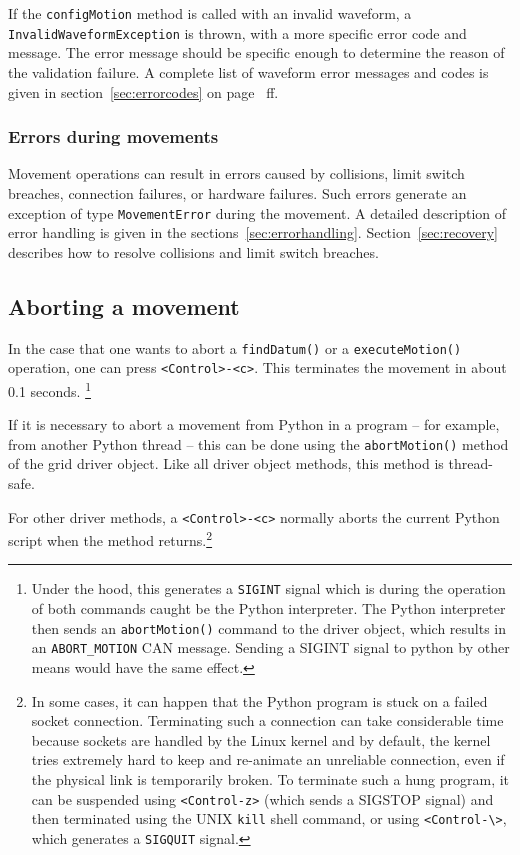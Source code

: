 \documentclass[11pt,a4paper]{scrartcl}
\begin{document}
\begin{sloppypar}
If the \texttt{configMotion} method is called with an invalid
waveform, a \texttt{InvalidWaveformException} is thrown, with a more
specific error code and message. The error message should be specific
enough to determine the reason of the validation failure.  A complete
list of waveform error messages and codes is given in
section~\ref{sec:errorcodes} on page~\pageref{sec:errorcodes} ff.
\end{sloppypar}

\subsubsection{Errors during movements}
Movement operations can result in errors caused by collisions, limit
switch breaches, connection failures, or hardware failures. Such
errors generate an exception of type \texttt{MovementError} during the
movement. A detailed description of error handling is given in the
sections~\ref{sec:errorhandling}. Section~\ref{sec:recovery} describes
how to resolve collisions and limit switch breaches.





\subsection{Aborting a movement}
  In the case
that one wants to abort a \texttt{findDatum()} or a
\texttt{executeMotion()} operation, one can press
\verb+<Control>-<c>+. This terminates the movement in about 0.1
seconds. \footnote{Under the hood, this generates a \texttt{SIGINT}
  signal which is during the operation of both commands caught be the
  Python interpreter. The Python interpreter then sends an
  \texttt{abortMotion()} command to the driver object, which results
  in an \texttt{ABORT\_MOTION} CAN message. Sending a SIGINT signal to
  python by other means would have the same effect.}

If it is necessary to abort a movement from Python in a program --
for example, from another Python thread -- this can be done using the
\texttt{abortMotion()} method of the grid driver object.  Like all
driver object methods, this method is thread-safe.

For other driver methods, a \verb+<Control>-<c>+ normally aborts the
current Python script when the method returns.\footnote{
  In some cases, it
  can happen that the Python program is stuck on a failed socket
  connection. Terminating such a connection can take considerable time
  because sockets are handled by the Linux kernel and by default, the
  kernel tries extremely hard to keep and re-animate an unreliable
  connection, even if the physical link is temporarily broken. To
  terminate such a hung program, it can be suspended using
  \texttt{<Control-z>} (which sends a SIGSTOP signal) and then
  terminated using the UNIX \texttt{kill} shell command, or using
  \texttt{<Control-\textbackslash>}, which generates a
  \texttt{SIGQUIT} signal.}
\end{document}
